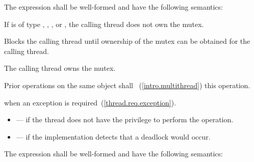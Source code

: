 \pnum
The expression  shall be well-formed and have the following semantics:

\begin{itemdescr}
\pnum
\requires If  is of type , ,
, or , the calling
thread does not own the mutex.

\pnum
\effects Blocks the calling thread until ownership of the mutex can be obtained for the calling thread.

\pnum
\postcondition The calling thread owns the mutex.

\pnum
\returntype {}

\pnum
\sync Prior  operations on the same object shall
~(\ref{intro.multithread}) this operation.

\pnum
\throws {} when
an exception is required~(\ref{thread.req.exception}).

\pnum \errors
\begin{itemize}
\item {} --- if the thread does not have the
privilege to perform the operation.

\item {} --- if the implementation detects
that a deadlock would occur.
\end{itemize}
\end{itemdescr}

\pnum
The expression  shall be well-formed and have the following semantics:

